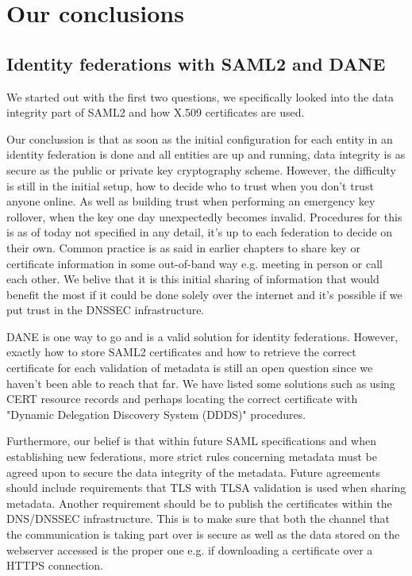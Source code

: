 \section{Our conclusions}
\subsection{Identity federations with SAML2 and DANE}
We started out with the first two questions, we specifically looked into the data integrity part of SAML2 and how X.509 certificates are used. 

Our conclussion is that as soon as the initial configuration for each entity in an identity federation is done and all 
entities are up and running, data integrity is as secure as the public or private key cryptography scheme.
However, the difficulty is still in the initial setup, how to decide who to trust when you don't trust anyone online. 
As well as building trust when performing an emergency key rollover, when the key one day unexpectedly becomes invalid. 
Procedures for this is as of today not specified in any detail, it's up to each federation to decide on their own.
Common practice is as said in earlier chapters to share key or certificate information in some out-of-band way e.g. meeting in person or call each other.
We belive that it is this initial sharing of information that would benefit the most if it could be done solely over the internet and it's possible if we put trust in the DNSSEC infrastructure.

DANE is one way to go and is a valid solution for identity federations.
However, exactly how to store SAML2 certificates and how to retrieve the correct certificate for each validation of metadata is still an open question since we haven't been able to reach that far.
We have listed some solutions such as using CERT resource records and perhaps locating the correct certificate with "Dynamic Delegation Discovery System (DDDS)" procedures.

Furthermore, our belief is that within future SAML specifications and when establishing new federations, more strict rules concerning metadata must be agreed upon to secure the data integrity of the metadata.
Future agreements should include requirements that TLS with TLSA validation is used when sharing metadata.
Another requirement should be to publish the certificates within the DNS/DNSSEC infrastructure.
This is to make sure that both the channel that the communication is taking part over is secure as well as the data stored on the webserver accessed is the proper one e.g. if downloading a certificate over a HTTPS connection.

